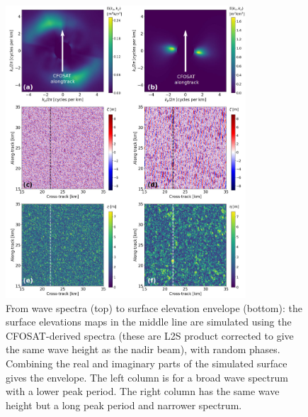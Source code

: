 {{%
\begin{figure}[hbt!]
\centerline{\includegraphics[width=0.8\textwidth]{FIGS_CH_GROUPS/DeCarlo_fig2.jpg}}
    \caption{From wave spectra (top) to surface elevation envelope (bottom): the surface elevations maps in the middle line are simulated using the CFOSAT-derived spectra (these are L2S product corrected to give the same wave height as the nadir beam), with random phases. Combining the real and imaginary parts of the simulated surface gives the envelope. The left column is for a broad wave spectrum with a lower peak period. The right column has the same wave height but a long peak period and narrower spectrum. } 
   \label{figure:groups_storm2}
\end{figure}

}}

